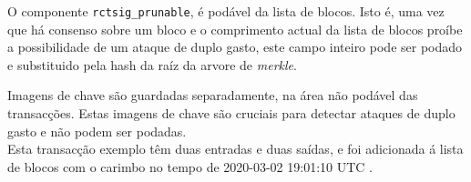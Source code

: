 \begin{appendices}

O componente {\tt rctsig\_prunable}, é podável da lista de blocos. Isto é, uma vez que há consenso sobre um bloco e o comprimento actual da lista de blocos proíbe a possibilidade de um ataque de duplo gasto, este campo inteiro pode ser podado e substituido pela hash da raíz da arvore de {\em merkle}. 


Imagens de chave são guardadas separadamente, na área não podável das transacções. Estas imagens de chave são cruciais para detectar ataques de duplo gasto e não podem ser podadas. 
\\
Esta transacção exemplo têm duas entradas e duas saídas, e foi adicionada á lista de blocos com o carimbo no tempo de 2020-03-02 19:01:10 UTC . 


\end{appendices}
